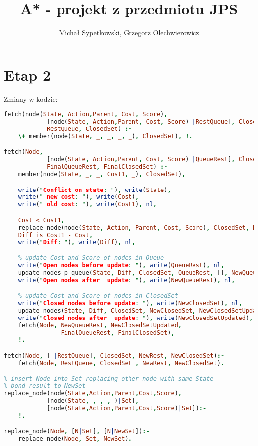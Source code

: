 \documentclass[11pt,a4paper]{article}
\title{A* - projekt z przedmiotu JPS}
\author{Michał Sypetkowski, Grzegorz Olechwierowicz}
\date{}
\begin{document}
\maketitle

\section{Etap 2}\label{sec:general}
Zmiany w kodzie:

\begin{lstlisting}[language=Prolog]
fetch(node(State, Action,Parent, Cost, Score),
            [node(State, Action,Parent, Cost, Score) |RestQueue], ClosedSet,
            RestQueue, ClosedSet) :-
    \+ member(node(State, _, _, _, _), ClosedSet), !.

fetch(Node,
            [node(State, Action,Parent, Cost, Score) |QueueRest], ClosedSet,
            FinalQueueRest, FinalClosedSet) :-
    member(node(State, _, _, Cost1, _), ClosedSet),

    write("Conflict on state: "), write(State),
    write(" new cost: "), write(Cost),
    write(" old cost: "), write(Cost1), nl,

    Cost < Cost1,
    replace_node(node(State, Action, Parent, Cost, Score), ClosedSet, NewClosedSet),
    Diff is Cost1 - Cost,
    write("Diff: "), write(Diff), nl,

    % update Cost and Score of nodes in Queue
    write("Open nodes before update: "), write(QueueRest), nl,
    update_nodes_p_queue(State, Diff, ClosedSet, QueueRest, [], NewQueueRest),
    write("Open nodes after  update: "), write(NewQueueRest), nl,

    % update Cost and Score of nodes in ClosedSet
    write("Closed nodes before update: "), write(NewClosedSet), nl,
    update_nodes(State, Diff, ClosedSet, NewClosedSet, NewClosedSetUpdated),
    write("Closed nodes after  update: "), write(NewClosedSetUpdated), nl,
    fetch(Node, NewQueueRest, NewClosedSetUpdated,
                FinalQueueRest, FinalClosedSet),
    !.

fetch(Node, [_|RestQueue], ClosedSet, NewRest, NewClosedSet):-
    fetch(Node, RestQueue, ClosedSet , NewRest, NewClosedSet).

% insert Node into Set replacing other node with same State
% bond result to NewSet
replace_node(node(State,Action,Parent,Cost,Score),
            [node(State,_,_,_,_)|Set],
            [node(State,Action,Parent,Cost,Score)|Set]):-
    !.

replace_node(Node, [N|Set], [N|NewSet]):-
    replace_node(Node, Set, NewSet).


\end{lstlisting}
\end{document}
